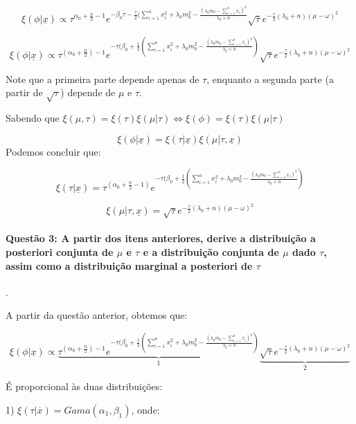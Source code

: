 \documentclass{article}
\begin{document}
	$$\xi(\phi | \underline{x}) \propto \tau^{\alpha_0 + \frac{n}{2} - 1} e^{-\beta_0 \tau - \frac{\tau}{2} (\sum_{i=1}^{n}x_i^2 + \lambda_0 m_0^2 - \frac{(\lambda_0 m_0 - \sum_{i=1}^{n}x_i)^2}{\lambda_0 + n}}  \sqrt{\tau} e^{-\frac{\tau}{2}(\lambda_0 + n)(\mu - \omega)^2}$$
	
	$$\xi(\phi | \underline{x}) \propto \tau^{(\alpha_0 + \frac{n}{2}) - 1} e^{-\tau (\beta_0 + \frac{1}{2} (\sum_{i=1}^{n}x_i^2 + \lambda_0 m_0^2 - \frac{(\lambda_0 m_0 - \sum_{i=1}^{n}x_i)^2}{\lambda_0 + n})} \sqrt{\tau} e^{-\frac{\tau}{2}(\lambda_0 + n)(\mu - \omega)^2}$$
	
	Note que a primeira parte depende apenas de $\tau$, enquanto a segunda parte (a partir de $\sqrt{\tau}$) depende de $\mu$ e $\tau$.
	
	Sabendo que $\xi(\mu, \tau) = \xi(\tau) \xi(\mu | \tau) \Leftrightarrow \xi(\phi) = \xi(\tau) \xi(\mu | \tau)$ 
	
	$$\xi(\phi | \underline{x}) = \xi(\tau | \underline{x}) \xi(\mu | \tau, \underline{x})$$
	Podemos concluir que:  
	
	$$\xi(\tau | \underline{x}) = \tau^{(\alpha_0 + \frac{n}{2} - 1)} e^{-\tau (\beta_0 + \frac{1}{2} (\sum_{i=1}^{n}x_i^2 + \lambda_0 m_0^2 - \frac{(\lambda_0 m_0 - \sum_{i=1}^{n}x_i)^2}{\lambda_0 + n})}$$
	
	$$ \xi(\mu | \tau, \underline{x}) = \sqrt{\tau} e^{-\frac{\tau}{2}(\lambda_0 + n)(\mu - \omega)^2}$$
	
	\paragraph{Questão 3: A partir dos itens anteriores, derive a distribuição a posteriori conjunta de
		$\mu$ e $\tau$ e a distribuição conjunta de $\mu$ dado $\tau$, assim como a distribuição marginal a posteriori de $\tau$}.
	
	A partir da questão anterior, obtemos que:
	
	$$\xi(\phi | \underline{x}) \propto \underbrace{\tau^{(\alpha_0 + \frac{n}{2}) - 1} e^{-\tau (\beta_0 + \frac{1}{2} (\sum_{i=1}^{n}x_i^2 + \lambda_0 m_0^2 - \frac{(\lambda_0 m_0 - \sum_{i=1}^{n}x_i)^2}{\lambda_0 + n})}}_{1} \underbrace{\sqrt{\tau} e^{-\frac{\tau}{2}(\lambda_0 + n)(\mu - \omega)^2}}_{2}$$
	
	É proporcional às duas distribuições: 
	
	1) $\xi(\tau | \overline{x}) = Gama(\alpha_1, \beta_1)$, onde:\\
	
\end{document}
